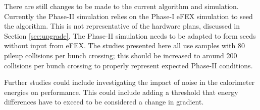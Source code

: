 There are still changes to be made to the current algorithm and simulation. Currently
the Phase-II simulation relies on the Phase-I eFEX simulation to seed the algorithm.
This is not representative of the hardware plans, discussed in Section \ref{sec:upgrade}.
The Phase-II simulation needs to be adapted to form seeds without input from eFEX.
The studies presented here all use samples with 80 pileup collisions per bunch crossing;
this should be increased to around 200 collisions per bunch crossing to properly
represent expected Phase-II conditions. 

Further studies could include investigating the impact of noise in the calorimeter
energies on \eratio performance. This could include adding a threshold that energy
differences have to exceed to be considered a change in gradient.
